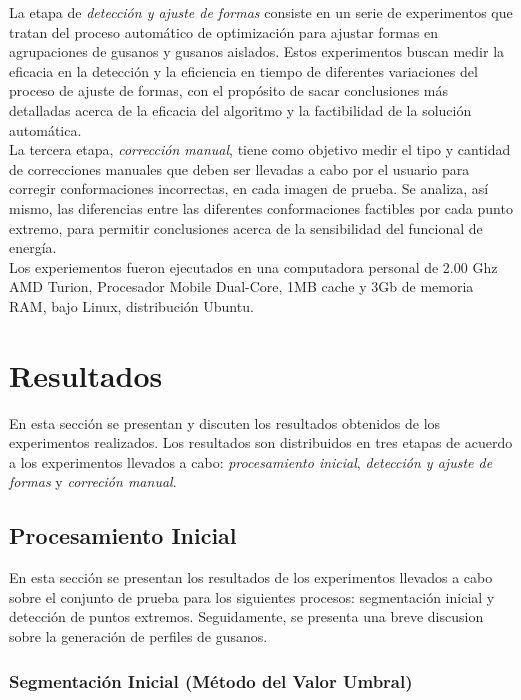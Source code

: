 La etapa de \emph{detecci\'on y ajuste de formas} consiste en un serie de experimentos que tratan
del proceso autom\'atico de optimizaci\'on para ajustar formas en agrupaciones de gusanos y 
gusanos aislados. Estos experimentos buscan medir la eficacia en la detecci\'on y la eficiencia
en tiempo de diferentes variaciones del proceso de ajuste de formas, con el prop\'osito de
sacar conclusiones m\'as detalladas acerca de la eficacia del algoritmo y la factibilidad de
la soluci\'on autom\'atica.\\

La tercera etapa, \emph{correcci\'on manual}, tiene como objetivo medir el tipo y cantidad
de correcciones manuales que deben ser llevadas a cabo por el usuario para corregir 
conformaciones incorrectas, en cada imagen de prueba. Se analiza,
 as\'i mismo, las diferencias entre las diferentes conformaciones factibles por cada
punto extremo, para permitir conclusiones acerca de la sensibilidad del funcional
de energ\'ia.\\

Los experiementos fueron ejecutados en una computadora personal de 2.00 Ghz AMD Turion,
Procesador Mobile Dual-Core, 1MB cache y 3Gb de memoria RAM, bajo Linux, distribuci\'on
Ubuntu.

\section{Resultados}
\label{sec:results}

En esta secci\'on se presentan y discuten los resultados obtenidos de los experimentos
realizados. Los resultados son distribuidos en tres etapas de acuerdo a los experimentos 
llevados a cabo: \emph{procesamiento inicial}, \emph{detecci\'on y ajuste de formas} y 
\emph{correci\'on manual}.

\subsection{Procesamiento Inicial}
\label{sec:initproc}

En esta secci\'on se presentan los resultados de los experimentos llevados a cabo sobre
el conjunto de prueba para los siguientes procesos: segmentaci\'on inicial y detecci\'on
de puntos extremos. Seguidamente, se presenta una breve discusion sobre la generaci\'on
de perfiles de gusanos.

\subsubsection*{Segmentaci\'on Inicial (M\'etodo del Valor Umbral)}

